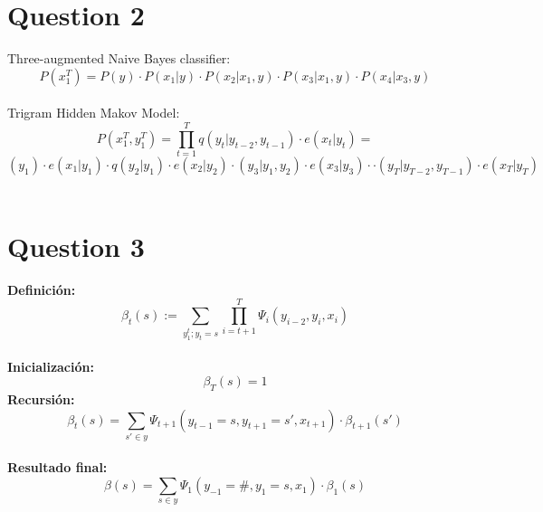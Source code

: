 \documentclass[12pt]{article}
\begin{document}
\newpage

\section*{Question 2}

Three-augmented Naive Bayes classifier:
\begin{equation*}
        P(x_1^T) = P(y) \cdot P(x_1 |  y) \cdot  P(x_2 |  x_1  ,y) \cdot  P(x_3 |  x_1  ,y) \cdot P(x_4 |  x_3  ,y) 
\end{equation*}
\\
Trigram Hidden Makov Model:
\begin{equation*}
    P(x_1^T,y_1^T ) = \prod\limits_{t=1}^{T} q(y_t | y_{t-2},y_{t-1} ) \cdot e(x_t |  y_t) = 
\end{equation*}
\begin{equation*}
        (y_1 )\cdot e(x_1 |  y_1) \cdot q(y_2  | y_1 ) \cdot e(x_2 |  y_2) \cdot (y_3  | y_1,y_2 ) \cdot e(x_3 |  y_3) \cdot  \cdot (y_T | y_{T-2},y_{T-1} ) \cdot e(x_T |  y_T)
\end{equation*}
\\
\section*{Question 3}
\textbf{Definición:}
\begin{equation*}
    \beta_t(s) :=  \sum\limits_{ y_1^t ; y_t = s} \prod\limits_{i= t+1}^{T} \Psi_i(y_{i-2}, y_i, x_i)
\end{equation*}
\\
\textbf{Inicialización:}
\begin{equation*}
    \beta_T(s) = 1
\end{equation*}
\textbf{Recursión:}
\begin{equation*}
    \beta_t(s) =  \sum\limits_{s' \in y} \Psi_{t+1}(y_{t-1} = s, y_{t+1} = s', x_{t+1}) \cdot \beta_{t+1}(s') 
\end{equation*}
\\
\textbf{Resultado final:}
\begin{equation*}
    \beta(s) =  \sum\limits_{s \in y} \Psi_{1}(y_{-1} = \#, y_{1} = s, x_1) \cdot \beta_{1}(s) 
\end{equation*}

\newpage
\end{document}
